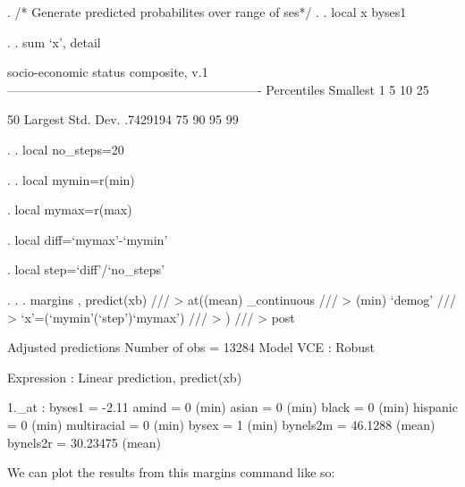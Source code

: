 \documentclass[12pt]{article}
\begin{document}
\begin{stlog}

. /* Generate predicted probabilites over range of ses*/
. 
. local x byses1

. 
. sum `x', detail

            socio-economic status composite, v.1
-------------------------------------------------------------
      Percentiles      Smallest
 1%
 5%
10%
25%

50%
                        Largest       Std. Dev.      .7429194
75%
90%
95%
99%

. 
. local no_steps=20

. 
. local mymin=r(min)

. local mymax=r(max)

. local diff=`mymax'-`mymin'

. local step=`diff'/`no_steps'

. 
.     
. margins , predict(xb) ///
>     at((mean) _continuous ///
>         (min) `demog' ///
>         `x'=(`mymin'(`step')`mymax') ///          
>        ) ///
>       post

Adjusted predictions                              Number of obs   =      13284
Model VCE    : Robust

Expression   : Linear prediction, predict(xb)

1._at        : byses1          =       -2.11
               amind           =           0 (min)
               asian           =           0 (min)
               black           =           0 (min)
               hispanic        =           0 (min)
               multiracial     =           0 (min)
               bysex           =           1 (min)
               bynels2m        =     46.1288 (mean)
               bynels2r        =    30.23475 (mean)
\end{stlog}

We can plot the results from this margins command like so: 
\end{document}
